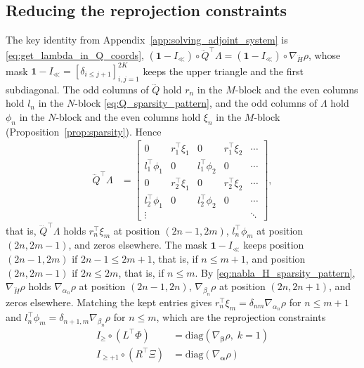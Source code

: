 \documentclass[a4paper,12pt]{article}
\theoremstyle{definition}
\begin{document}
\subsection{Reducing the reprojection constraints}
The key identity from Appendix~\ref{app:solving_adjoint_system} is \eqref{eq:get_lambda_in_Q_coords}, $(\mathbf{1} - I_{\ll}) \circ \dddot{Q}^\top \Lambda = (\mathbf{1} - I_{\ll}) \circ \nabla_{\dddot{H}} \rho$, whose mask $\mathbf{1} - I_{\ll} = [\delta_{i \leq j+1}]_{i,j=1}^{2K}$ keeps the upper triangle and the first subdiagonal.
The odd columns of $\dddot{Q}$ hold $r_n$ in the $M$-block and the even columns hold $l_n$ in the $N$-block \eqref{eq:Q_sparsity_pattern}, and the odd columns of $\Lambda$ hold $\phi_n$ in the $N$-block and the even columns hold $\xi_n$ in the $M$-block (Proposition~\ref{prop:sparsity}). Hence
\begin{align*}
    \dddot{Q}^\top \Lambda &= \begin{bmatrix}
    0 & r_1^\top \xi_1 & 0 & r_1^\top \xi_2 & \cdots \\
    l_1^\top \phi_1 & 0 & l_1^\top \phi_2 & 0 & \cdots \\
    0 & r_2^\top \xi_1 & 0 & r_2^\top \xi_2 & \cdots \\
    l_2^\top \phi_1 & 0 & l_2^\top \phi_2 & 0 & \cdots \\
    \vdots & & & & \ddots
    \end{bmatrix},
\end{align*}
that is, $\dddot{Q}^\top \Lambda$ holds $r_n^\top \xi_m$ at position $(2n{-}1, 2m)$, $l_n^\top \phi_m$ at position $(2n, 2m{-}1)$, and zeros elsewhere. The mask $\mathbf{1} - I_{\ll}$ keeps position $(2n{-}1, 2m)$ if $2n - 1 \leq 2m + 1$, that is, if $n \leq m + 1$, and position $(2n, 2m{-}1)$ if $2n \leq 2m$, that is, if $n \leq m$. By \eqref{eq:nabla_H_sparsity_pattern}, $\nabla_{\dddot{H}} \rho$ holds $\nabla_{\alpha_n}\rho$ at position $(2n{-}1, 2n)$, $\nabla_{\beta_n}\rho$ at position $(2n, 2n{+}1)$, and zeros elsewhere. Matching the kept entries gives $r_n^\top \xi_m = \delta_{nm} \nabla_{\alpha_n}\rho$ for $n \leq m + 1$ and $l_n^\top \phi_m = \delta_{n+1, m} \nabla_{\beta_n}\rho$ for $n \leq m$, which are the reprojection constraints
\begin{align}
    I_{\geq} \circ (L^\top \Phi) &= \text{diag}(\nabla_{\boldsymbol{\beta}}\rho,\; k\!=\!1) \label{eq:stable_reprojection_L}
    \\
    I_{\geq+1} \circ (R^\top \Xi) &= \text{diag}(\nabla_{\boldsymbol{\alpha}}\rho) \label{eq:stable_reprojection_R}
\end{align}
\end{document}

